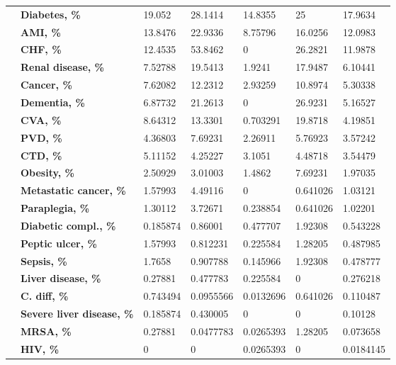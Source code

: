\begin{tabular}{lllllll}
               & \textbf{Diabetes, \%} &    19.052 &     28.1414 &    14.8355 &        25 &    17.9634 \\
               & \textbf{AMI, \%} &   13.8476 &     22.9336 &    8.75796 &   16.0256 &    12.0983 \\
               & \textbf{CHF, \%} &   12.4535 &     53.8462 &          0 &   26.2821 &    11.9878 \\
               & \textbf{Renal disease, \%} &   7.52788 &     19.5413 &     1.9241 &   17.9487 &    6.10441 \\
               & \textbf{Cancer, \%} &   7.62082 &     12.2312 &    2.93259 &   10.8974 &    5.30338 \\
               & \textbf{Dementia, \%} &   6.87732 &     21.2613 &          0 &   26.9231 &    5.16527 \\
               & \textbf{CVA, \%} &   8.64312 &     13.3301 &   0.703291 &   19.8718 &    4.19851 \\
               & \textbf{PVD, \%} &   4.36803 &     7.69231 &    2.26911 &   5.76923 &    3.57242 \\
               & \textbf{CTD, \%} &   5.11152 &     4.25227 &     3.1051 &   4.48718 &    3.54479 \\
               & \textbf{Obesity, \%} &   2.50929 &     3.01003 &     1.4862 &   7.69231 &    1.97035 \\
               & \textbf{Metastatic cancer, \%} &   1.57993 &     4.49116 &          0 &  0.641026 &    1.03121 \\
               & \textbf{Paraplegia, \%} &   1.30112 &     3.72671 &   0.238854 &  0.641026 &    1.02201 \\
               & \textbf{Diabetic compl., \%} &  0.185874 &     0.86001 &   0.477707 &   1.92308 &   0.543228 \\
               & \textbf{Peptic ulcer, \%} &   1.57993 &    0.812231 &   0.225584 &   1.28205 &   0.487985 \\
               & \textbf{Sepsis, \%} &    1.7658 &    0.907788 &   0.145966 &   1.92308 &   0.478777 \\
               & \textbf{Liver disease, \%} &   0.27881 &    0.477783 &   0.225584 &         0 &   0.276218 \\
               & \textbf{C. diff, \%} &  0.743494 &   0.0955566 &  0.0132696 &  0.641026 &   0.110487 \\
               & \textbf{Severe liver disease, \%} &  0.185874 &    0.430005 &          0 &         0 &    0.10128 \\
               & \textbf{MRSA, \%} &   0.27881 &   0.0477783 &  0.0265393 &   1.28205 &   0.073658 \\
               & \textbf{HIV, \%} &         0 &           0 &  0.0265393 &         0 &  0.0184145 \\
\bottomrule
\end{tabular}
